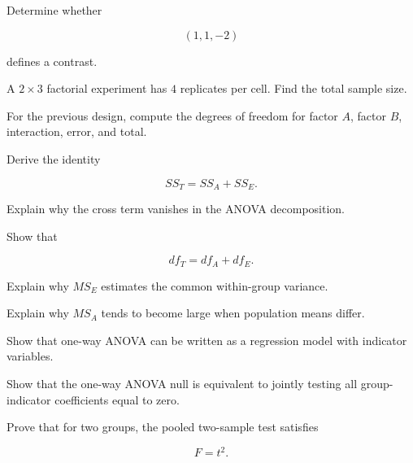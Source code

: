 \begin{exercise}[2]
Determine whether

\[
(1,1,-2)
\]

defines a contrast.
\end{exercise}

\begin{exercise}[2]
A \(2\times3\) factorial experiment has \(4\) replicates per cell.
Find the total sample size.
\end{exercise}

\begin{exercise}[2]
For the previous design, compute the degrees of freedom for factor \(A\),
factor \(B\), interaction, error, and total.
\end{exercise}

\begin{exercise}[3]
Derive the identity

\[
SS_T
=
SS_A+SS_E.
\]
\end{exercise}

\begin{exercise}[3]
Explain why the cross term vanishes in the ANOVA decomposition.
\end{exercise}

\begin{exercise}[3]
Show that

\[
df_T
=
df_A+df_E.
\]
\end{exercise}

\begin{exercise}[3]
Explain why \(MS_E\) estimates the common within-group variance.
\end{exercise}

\begin{exercise}[3]
Explain why \(MS_A\) tends to become large when population means differ.
\end{exercise}

\begin{exercise}[3]
Show that one-way ANOVA can be written as a regression model with
indicator variables.
\end{exercise}

\begin{exercise}[3]
Show that the one-way ANOVA null is equivalent to jointly testing all
group-indicator coefficients equal to zero.
\end{exercise}

\begin{exercise}[3]
Prove that for two groups, the pooled two-sample test satisfies

\[
F=t^2.
\]
\end{exercise}

